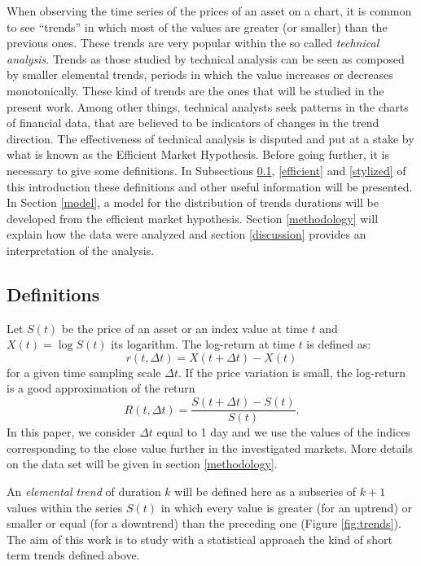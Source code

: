 \documentclass[a4paper]{jpconf}
\begin{document}
When observing the time series of the prices of an asset on a chart, it is common to see ``trends'' in which most of the values are greater (or smaller) than the previous ones. These trends are very popular within the so called {\it technical analysis}. Trends as those studied by technical analysis can be seen as composed by smaller elemental trends, periods in which the value increases or decreases monotonically. These kind of trends are the ones that will be studied in the present work. Among other things, technical analysts seek patterns in the charts of financial data, that are believed to be indicators of changes in the trend direction. The effectiveness of technical analysis is disputed and put at a stake by what is known as the Efficient Market Hypothesis. Before going further, it is necessary to give some definitions. In Subsections \ref{def}, \ref{efficient} and \ref{stylized} of this introduction these definitions and other useful information will be presented. In Section \ref{model}, a model for the distribution of trends durations will be developed from the efficient market hypothesis. Section \ref{methodology} will explain how the data were analyzed and section \ref{discussion} provides an interpretation of the analysis.
\subsection{Definitions} 
\label{def}
Let $S(t)$ be the price of an asset or an index value at time $t$ and $X(t) = \log{S(t)}$ its logarithm. The log-return at time $t$ is defined as:
\begin{equation}
r(t,\Delta{t}) = X(t + \Delta{t}) - X(t)
\end{equation}
for a given time sampling scale $\Delta{t}$. If the price variation is small, the log-return is a good approximation of the return
\begin{equation}
R(t,\Delta t) = \frac{S(t+\Delta t) - S(t)}{S(t)}.
\end{equation}
In this paper, we consider $\Delta t$ equal to 1 day and we use the values of the indices corresponding to the close value further in the investigated markets. More details on the data set will be given in section \ref{methodology}.

An {\it elemental trend} of duration $k$ will be defined here as a subseries of $k+1$ values within the series $S(t)$ in which every value is greater (for an uptrend) or smaller or equal (for a downtrend) than the preceding one (Figure \ref{fig:trends}). The aim of this work is to study with a statistical approach the kind of short term trends defined above.
\end{document}
